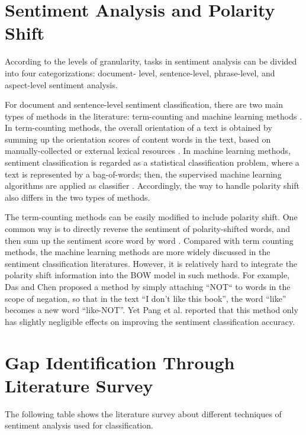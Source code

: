 \documentclass[oneside,a4paper,12pt]{pictreport}
\begin{document}
\section{Sentiment Analysis and Polarity Shift}
\hspace{1.1cm}According to the levels of granularity, tasks in sentiment
analysis can be divided into four categorizations: document-
level, sentence-level, phrase-level, and aspect-level sentiment analysis.
\par 
For document and sentence-level sentiment classification, 
there are two main types of methods in the literature:
term-counting and machine learning methods \cite{yahoo} \cite{pang} \cite{pang2008} \cite{ruiEnssemble}. In 
term-counting methods, the overall orientation of a text is
obtained by summing up the orientation scores of content
words in the text, based on manually-collected or external
lexical resources \cite{turney} \cite{turney1}. In machine learning methods,
sentiment classification is regarded as a statistical 
classification problem, where a text is represented by a 
bag-of-words; then, the supervised machine learning algorithms
are applied as classifier \cite{pang}. Accordingly, 
the way to handle polarity shift also differs in the two types of methods.
\par
The term-counting methods can be easily modified to
include polarity shift. One common way is to directly
reverse the sentiment of polarity-shifted words, and then
sum up the sentiment score word by word \cite{valence}. Compared with term counting methods, the machine
learning methods are more widely discussed in the 
sentiment classification literatures. However, it is relatively
hard to integrate the polarity shift information into the
BOW model in such methods. For example, Das and
Chen \cite{yahoo} proposed a method by simply attaching ``NOT``
to words in the scope of negation, so that in the text ``I
don't like this book'', the word ``like'' becomes a new word ``like-NOT''.
Yet Pang et al. \cite{pang} reported that this method only
has slightly negligible effects on improving the sentiment
classification accuracy.
\newpage




\section{Gap Identification Through Literature Survey}

The following table shows the literature survey about different techniques of sentiment analysis used for classification. 
\end{document}

